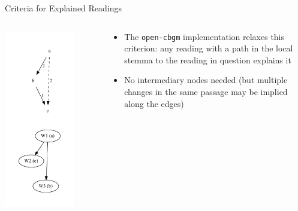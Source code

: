 \documentclass[10pt]{beamer}
\begin{document}
\begin{frame}{Criteria for Explained Readings}
\begin{columns}
\begin{column}{0.4\textwidth}
				\includegraphics[width=0.75\textwidth]{../graphics/transitivity-example.pdf}
			\end{column}
			\begin{column}{0.55\textwidth}
				\begin{itemize}
					\item The \texttt{open-cbgm} implementation relaxes this criterion: any reading with a path in the local stemma to the reading in question explains it
					\item No intermediary nodes needed (but multiple changes in the same passage may be implied along the edges)
				\end{itemize}
			\end{column}
		\end{columns}
	\end{frame}
\end{document}
